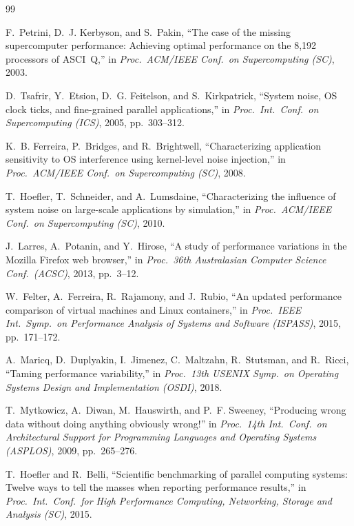 \documentclass[10pt,conference]{IEEEtran}
\begin{document}
\begin{thebibliography}{99}

F.~Petrini, D.~J. Kerbyson, and S.~Pakin, ``The case of the missing
supercomputer performance: Achieving optimal performance on the 8,192
processors of ASCI~Q,'' in \emph{Proc.\ ACM/IEEE Conf.\ on Supercomputing
(SC)}, 2003.

D.~Tsafrir, Y.~Etsion, D.~G. Feitelson, and S.~Kirkpatrick, ``System noise,
OS clock ticks, and fine-grained parallel applications,'' in \emph{Proc.\
Int.\ Conf.\ on Supercomputing (ICS)}, 2005, pp.\ 303--312.

K.~B. Ferreira, P.~Bridges, and R.~Brightwell, ``Characterizing application
sensitivity to OS interference using kernel-level noise injection,'' in
\emph{Proc.\ ACM/IEEE Conf.\ on Supercomputing (SC)}, 2008.

T.~Hoefler, T.~Schneider, and A.~Lumsdaine, ``Characterizing the influence
of system noise on large-scale applications by simulation,'' in \emph{Proc.\
ACM/IEEE Conf.\ on Supercomputing (SC)}, 2010.

J.~Larres, A.~Potanin, and Y.~Hirose, ``A study of performance variations in
the Mozilla Firefox web browser,'' in \emph{Proc.\ 36th Australasian
Computer Science Conf.\ (ACSC)}, 2013, pp.\ 3--12.

W.~Felter, A.~Ferreira, R.~Rajamony, and J.~Rubio, ``An updated performance
comparison of virtual machines and Linux containers,'' in \emph{Proc.\ IEEE
Int.\ Symp.\ on Performance Analysis of Systems and Software (ISPASS)},
2015, pp.\ 171--172.

A.~Maricq, D.~Duplyakin, I.~Jimenez, C.~Maltzahn, R.~Stutsman, and R.~Ricci,
``Taming performance variability,'' in \emph{Proc.\ 13th USENIX Symp.\ on
Operating Systems Design and Implementation (OSDI)}, 2018.

T.~Mytkowicz, A.~Diwan, M.~Hauswirth, and P.~F. Sweeney, ``Producing wrong
data without doing anything obviously wrong!'' in \emph{Proc.\ 14th Int.\
Conf.\ on Architectural Support for Programming Languages and Operating
Systems (ASPLOS)}, 2009, pp.\ 265--276.

\bibitem{hoefler2015}
T.~Hoefler and R.~Belli, ``Scientific benchmarking of parallel computing
systems: Twelve ways to tell the masses when reporting performance
results,'' in \emph{Proc.\ Int.\ Conf.\ for High Performance Computing,
Networking, Storage and Analysis (SC)}, 2015.


\end{thebibliography}
\end{document}
